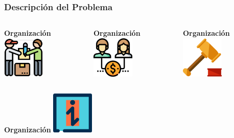\documentclass[xcolor=dvipsnames]{beamer}
\begin{document}
\begin{frame}
    \frametitle{Descripción del Problema}
    \vspace{5mm}
    \begin{columns}
      \begin{column}{0.3\textwidth}
        \centering\textbf{\textcolor{color3}{Organización}\vspace{3mm}}
        \vspace{10mm}
        \includegraphics[width=20mm]{002-delivery-man.pdf}
      \end{column}
      \begin{column}{0.3\textwidth}
        \centering\textbf{\textcolor{color3}{Organización}\vspace{3mm}}
        \vspace{10mm}
        \includegraphics[width=20mm]{010-affiliate.pdf}
      \end{column}
      \begin{column}{0.3\textwidth}
        \centering\textbf{\textcolor{color3}{Organización}\vspace{3mm}}
        \vspace{10mm}
        \includegraphics[width=20mm]{004-auction.pdf}
      \end{column}
    \end{columns}
    \begin{columns}
      \begin{column}{0.3\textwidth}
        \centering\textbf{\textcolor{color3}{Organización}\vspace{3mm}}
        \vspace{10mm}
        \includegraphics[width=20mm]{007-information.pdf}

\end{column}
\end{columns}
\end{frame}
\end{document}
